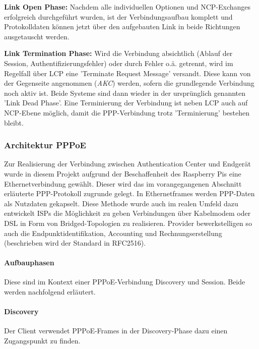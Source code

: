 \textbf{Link Open Phase:}
Nachdem alle individuellen Optionen und NCP-Exchanges erfolgreich durchgeführt wurden,
ist der Verbindungsaufbau komplett und Protokolldaten können jetzt über den aufgebauten
Link in beide Richtungen ausgetauscht werden.

\textbf{Link Termination Phase:}
Wird die Verbindung absichtlich (Ablauf der Session, Authentifizierungsfehler)
oder durch Fehler o.ä. getrennt, wird im Regelfall über \ac{LCP}
eine 'Terminate Request Message' versandt. Diese kann von der Gegenseite
angenommen (\textit{AKC}) werden, sofern die grundlegende Verbindung noch aktiv ist.
Beide Systeme sind dann wieder in der ursprünglich genannten 'Link Dead Phase'.
Eine Terminierung der Verbindung ist neben \ac{LCP} auch auf \ac{NCP}-Ebene möglich,
damit die PPP-Verbindung trotz 'Terminierung' bestehen bleibt.


\subsubsection{Architektur PPPoE}\label{subsubsection:architecture_pppoe}
Zur Realisierung der Verbindung zwischen Authentication Center und
Endgerät wurde in diesem Projekt aufgrund der Beschaffenheit des Raspberry Pis eine
Ethernetverbindung gewählt. Dieser wird das im vorangegangenen
Abschnitt erläuterte \ac{PPP}-Protokoll zugrunde gelegt.
In Ethernetframes werden PPP-Daten als Nutzdaten gekapselt.
Diese Methode wurde auch im realen Umfeld dazu entwickelt \acp{ISP} die
Möglichkeit zu geben Verbindungen über Kabelmodem oder DSL in Form
von Bridged-Topologien zu realisieren. Provider bewerkstelligen
so auch die Endpunktidentifikation, Accounting und Rechnungserstellung
(beschrieben wird der Standard in RFC2516).

\paragraph{Aufbauphasen}
Diese sind im Kontext einer PPPoE-Verbindung Discovery und Session.
Beide werden nachfolgend erläutert.

\paragraph{Discovery}
Der Client verwendet PPPoE-Frames in der Discovery-Phase dazu einen
Zugangspunkt zu finden.

